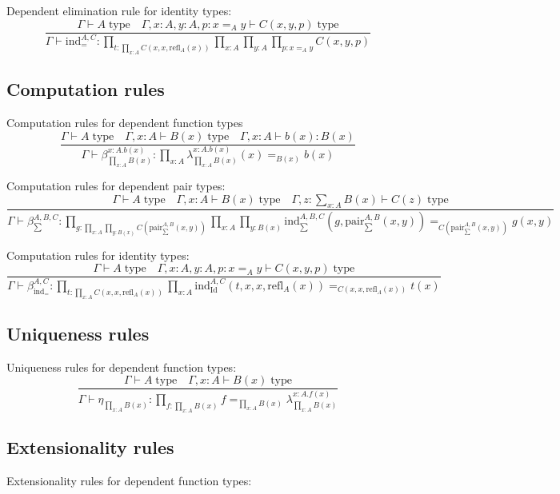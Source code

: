 \documentclass{book}
\begin{document}
Dependent elimination rule for identity types:
$$\frac{\Gamma \vdash A \; \mathrm{type} \quad \Gamma, x:A, y:A, p:x =_A y \vdash C(x, y, p) \; \mathrm{type}}{\Gamma \vdash \mathrm{ind}_{=}^{A, C}:\prod_{t:\prod_{x:A} C(x, x, \mathrm{refl}_A(x))} \prod_{x:A} \prod_{y:A} \prod_{p:x =_A y} C(x, y, p)}$$

\subsection{Computation rules}

Computation rules for dependent function types
$$\frac{\Gamma \vdash A \; \mathrm{type} \quad \Gamma, x:A \vdash B(x) \; \mathrm{type} \quad \Gamma, x:A \vdash b(x):B(x)}{\Gamma \vdash \beta_{\prod_{x:A} B(x)}^{x:A.b(x)}:\prod_{x:A} \lambda_{\prod_{x:A} B(x)}^{x:A.b(x)}(x) =_{B(x)} b(x)}$$

Computation rules for dependent pair types:
$$\frac{\Gamma \vdash A \; \mathrm{type} \quad \Gamma, x:A \vdash B(x) \; \mathrm{type} \quad \Gamma, z:\sum_{x:A} B(x) \vdash C(z) \; \mathrm{type}}{\Gamma \vdash \beta_{\sum}^{A, B, C}:\prod_{g:\prod_{x:A} \prod_{y:B(x)} C(\mathrm{pair}_{\sum}^{A, B}(x, y))} \prod_{x:A} \prod_{y:B(x)} \mathrm{ind}_{\sum}^{A, B, C}(g, \mathrm{pair}_{\sum}^{A, B}(x, y)) =_{C(\mathrm{pair}_{\sum}^{A, B}(x, y))} g(x, y)}$$

Computation rules for identity types:
$$\frac{\Gamma \vdash A \; \mathrm{type} \quad \Gamma, x:A, y:A, p:x =_A y \vdash C(x, y, p) \; \mathrm{type}}{\Gamma \vdash \beta_{\mathrm{ind}_{=}}^{A, C}:\prod_{t:\prod_{x:A} C(x, x, \mathrm{refl}_A(x))} \prod_{x:A} \mathrm{ind}_{\mathrm{Id}}^{A, C}(t, x, x, \mathrm{refl}_A(x)) =_{C(x, x, \mathrm{refl}_A(x))} t(x)}$$

\subsection{Uniqueness rules}

Uniqueness rules for dependent function types:
$$\frac{\Gamma \vdash A \; \mathrm{type} \quad \Gamma, x:A \vdash B(x) \; \mathrm{type}}{\Gamma \vdash \eta_{\prod_{x:A} B(x)}:\prod_{f:\prod_{x:A} B(x)} f =_{\prod_{x:A} B(x)} \lambda_{\prod_{x:A} B(x)}^{x:A.f(x)}}$$

\subsection{Extensionality rules}

Extensionality rules for dependent function types:
\end{document}
